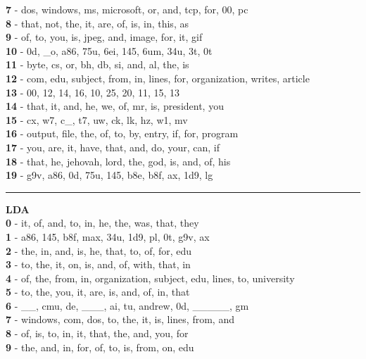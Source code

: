 \textbf{7} - dos, windows, ms, microsoft, or, and, tcp, for, 00, pc\\
\textbf{8} - that, not, the, it, are, of, is, in, this, as\\
\textbf{9} - of, to, you, is, jpeg, and, image, for, it, gif\\
\textbf{10} - 0d, \_o, a86, 75u, 6ei, 145, 6um, 34u, 3t, 0t\\
\textbf{11} - byte, cs, or, bh, db, si, and, al, the, is\\
\textbf{12} - com, edu, subject, from, in, lines, for, organization, writes, article\\
\textbf{13} - 00, 12, 14, 16, 10, 25, 20, 11, 15, 13\\
\textbf{14} - that, it, and, he, we, of, mr, is, president, you\\
\textbf{15} - cx, w7, c\_, t7, uw, ck, lk, hz, w1, mv\\
\textbf{16} - output, file, the, of, to, by, entry, if, for, program\\
\textbf{17} - you, are, it, have, that, and, do, your, can, if\\
\textbf{18} - that, he, jehovah, lord, the, god, is, and, of, his\\
\textbf{19} - g9v, a86, 0d, 75u, 145, b8e, b8f, ax, 1d9, lg\\
\hrule\vspace{2mm}
\noindent
\textbf{LDA}\vspace{2mm}\\
\vspace{2mm}
\noindent
\textbf{0} - it, of, and, to, in, he, the, was, that, they\\
\textbf{1} - a86, 145, b8f, max, 34u, 1d9, pl, 0t, g9v, ax\\
\textbf{2} - the, in, and, is, he, that, to, of, for, edu\\
\textbf{3} - to, the, it, on, is, and, of, with, that, in\\
\textbf{4} - of, the, from, in, organization, subject, edu, lines, to, university\\
\textbf{5} - to, the, you, it, are, is, and, of, in, that\\
\textbf{6} - \_\_, cmu, de, \_\_\_, ai, tu, andrew, 0d, \_\_\_\_\_, gm\\
\textbf{7} - windows, com, dos, to, the, it, is, lines, from, and\\
\textbf{8} - of, is, to, in, it, that, the, and, you, for\\
\textbf{9} - the, and, in, for, of, to, is, from, on, edu\\

